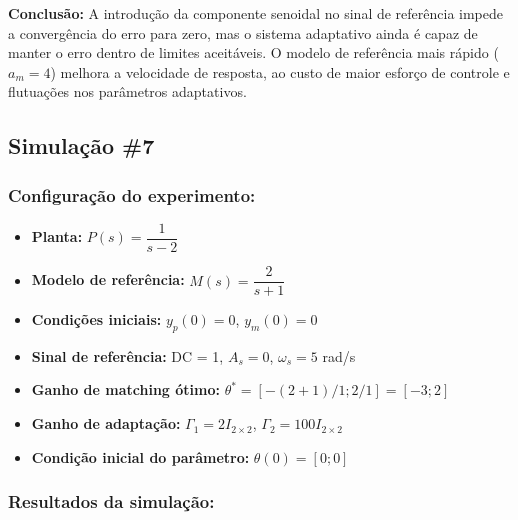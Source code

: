 \documentclass[10pt]{article}
\begin{document}
\textbf{Conclusão:} A introdução da componente senoidal no sinal de referência impede a convergência do erro para zero, mas o sistema adaptativo ainda é capaz de manter o erro dentro de limites aceitáveis. O modelo de referência mais rápido ($a_m = 4$) melhora a velocidade de resposta, ao custo de maior esforço de controle e flutuações nos parâmetros adaptativos.

\newpage

\subsection{Simulação \#7}
\subsubsection{Configuração do experimento:}
\begin{itemize}
\item \textbf{Planta:} $P(s) = \dfrac{1}{s - 2}$
\item \textbf{Modelo de referência:} $M(s) = \dfrac{2}{s + 1}$
\item \textbf{Condições iniciais:} $y_p(0)=0$, $y_m(0)=0$
\item \textbf{Sinal de referência:} DC = 1, $A_s=0$, $\omega_s=5$ rad/s
\item \textbf{Ganho de matching ótimo:} $\theta^* = [-(2+1)/1;2/1] = [-3;2]$
\item \textbf{Ganho de adaptação:} $\Gamma_1 = 2I_{2\times2}$, $\Gamma_2 = 100I_{2\times2}$
\item \textbf{Condição inicial do parâmetro:} $\theta(0) = [0;0]$
\end{itemize}

\subsubsection{Resultados da simulação:}
\end{document}
